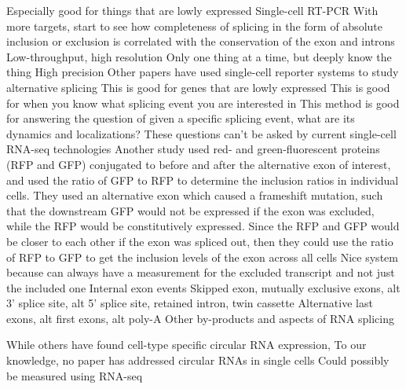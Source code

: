 Especially good for things that are lowly expressed
Single-cell RT-PCR
With more targets, start to see how completeness of splicing in the form of absolute inclusion or exclusion is correlated with the conservation of the exon and introns \cite{Faigenbloom2015-jo}
Low-throughput, high resolution
Only one thing at a time, but deeply know the thing
High precision
Other papers have used single-cell reporter systems to study alternative splicing
This is good for genes that are lowly expressed
This is good for when you know what splicing event you are interested in
This method is good for answering the question of given a specific splicing event, what are its dynamics and localizations?
These questions can't be asked by current single-cell RNA-seq technologies 
Another study used red- and green-fluorescent proteins (RFP and GFP) conjugated to before and after the alternative exon of interest, and used the ratio of GFP to RFP to determine the inclusion ratios in individual cells. \cite{Gurskaya:2012hm}
They used an alternative exon which caused a frameshift mutation, such that the downstream GFP would not be expressed if the exon was excluded, while the RFP would be constitutively expressed.
Since the RFP and GFP would be closer to each other if the exon was spliced out, then they could use the ratio of RFP to GFP to get the inclusion levels of the exon across all cells
Nice system because can always have a measurement for the excluded transcript and not just the included one
\cite{Norris:2014br}
Internal exon events
Skipped exon, mutually exclusive exons, alt 3' splice site, alt 5' splice site, retained intron, twin cassette
Alternative last exons, alt first exons, alt poly-A
Other by-products and aspects of RNA splicing


While others have found cell-type specific circular RNA \cite{Salzman2013-ol}  expression, To our knowledge, no paper has addressed circular RNAs in single cells
Could possibly be measured using RNA-seq


